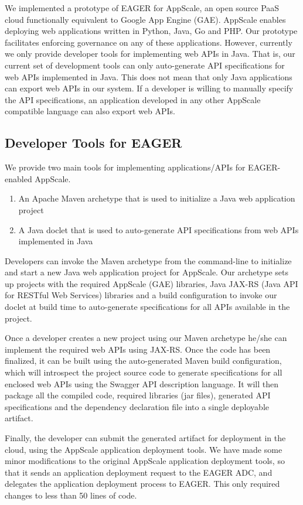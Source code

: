 We implemented a prototype of EAGER for AppScale, an open source PaaS cloud functionally equivalent to Google App Engine (GAE). 
AppScale enables deploying web applications written in Python, Java, Go and PHP. Our prototype facilitates enforcing governance on
any of these applications. However, currently we only provide developer tools for implementing web APIs in Java. That is, our current set of development
tools can only auto-generate API specifications for web APIs implemented in Java. This does not mean that only Java applications can export web
APIs in our system. If a developer is willing to manually specify the API specifications, an application developed in any other AppScale compatible
language can also export web APIs.

\subsection{Developer Tools for EAGER}
We provide two main tools for implementing applications/APIs for EAGER-enabled AppScale.
\begin{enumerate}
\item An Apache Maven archetype that is used to initialize a Java web application project
\item A Java doclet that is used to auto-generate API specifications from web APIs implemented in Java
\end{enumerate}

Developers can invoke the Maven archetype from the command-line to initialize and start a new Java web application project for AppScale. Our
archetype sets up projects with the required AppScale (GAE) libraries, Java JAX-RS (Java API for RESTful Web Services) libraries 
and a build configuration to
invoke our doclet at build time to auto-generate specifications for all APIs available in the project.

Once a developer creates a new project using our Maven archetype he/she can implement the required web APIs using JAX-RS. Once the code has 
been finalized, it can be built using the auto-generated Maven build configuration, which will introspect the project source code to
generate specifications for all enclosed web APIs using the Swagger API description language. It will
then package all the compiled code, required libraries (jar files), generated API specifications and the dependency declaration file into a single deployable
artifact.

Finally, the developer can submit the generated artifact for deployment in the cloud, using the AppScale application deployment tools. We have
made some minor modifications to the original AppScale application deployment tools, so that it sends an application deployment request to
the EAGER ADC, and delegates the application deployment process to EAGER. This only required changes to less than 50 lines of code.

